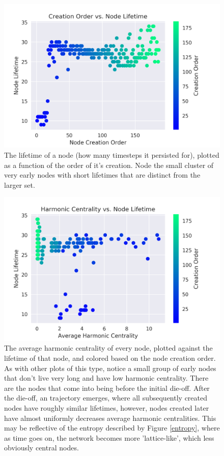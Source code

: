\documentclass{paper}
\begin{document}
	\begin{figure}[h]
		\centering
		\includegraphics[scale=0.75]{creation_order_lifetimes.png}
		\caption{The lifetime of a node (how many timesteps it persisted for), plotted as a function of the order of it's creation. Node the small cluster of very early nodes with short lifetimes that are distinct from the larger set.}
		\label{order-lifetime}
	\end{figure}
	
	\begin{figure}[h]
		\centering
		\includegraphics[scale=0.75]{harmonic_lifetimes.png}
		\caption{The average harmonic centrality of every node, plotted against the lifetime of that node, and colored based on the node creation order. As with other plots of this type, notice a small group of early nodes that don't live very long and have low harmonic centrality. There are the nodes that come into being before the initial die-off. After the die-off, an trajectory emerges, where all subsequently created nodes have roughly similar lifetimes, however, nodes created later have almost uniformly decreases average harmonic centralities. This may be reflective of the entropy described by Figure \ref{entropy}, where as time goes on, the network becomes more 'lattice-like', which less obviously central nodes.}
		\label{harmonic-lifetime}
	\end{figure}
	
\end{document}
